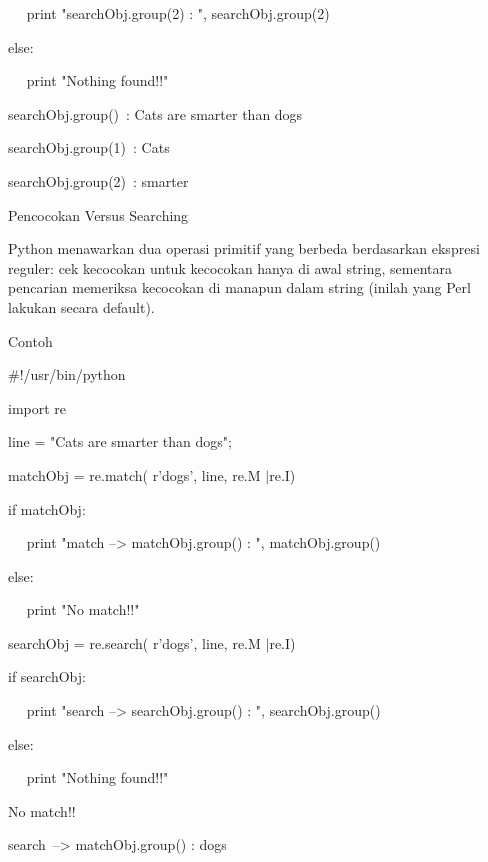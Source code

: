 ~~ print "searchObj.group(2) : ", searchObj.group(2) \par
\noindent 
else: \par
\noindent 
~~ print "Nothing found!!" \par
\vspace{12pt}
\noindent 
searchObj.group()~:  Cats are smarter than dogs \par
\noindent 
searchObj.group(1)~:  Cats \par
\noindent 
searchObj.group(2)~:  smarter \par
\noindent 
Pencocokan Versus Searching \par
\vspace{12pt}
Python menawarkan dua operasi primitif yang berbeda berdasarkan ekspresi reguler: cek kecocokan untuk kecocokan hanya di awal string, sementara pencarian memeriksa kecocokan di manapun dalam string (inilah yang Perl lakukan secara default). \par
Contoh \par
\noindent 
 $  \#  $!/usr/bin/python \par
\noindent 
import re \par
\vspace{12pt}
\noindent 
line = "Cats are smarter than dogs"; \par
\vspace{12pt}
\noindent 
matchObj = re.match( r'dogs', line, re.M $  \vert  $re.I) \par
\noindent 
if matchObj: \par
\noindent 
~~ print "match --> matchObj.group() : ", matchObj.group() \par
\noindent 
else: \par
\noindent 
~~ print "No match!!" \par
\vspace{12pt}
\noindent 
searchObj = re.search( r'dogs', line, re.M $  \vert  $re.I) \par
\noindent 
if searchObj: \par
\noindent 
~~ print "search --> searchObj.group() : ", searchObj.group() \par
\noindent 
else: \par
\noindent 
~~ print "Nothing found!!" \par
\vspace{12pt}
\noindent 
No match!! \par
\noindent 
search~--> matchObj.group() :  dogs \par
\vspace{12pt}
